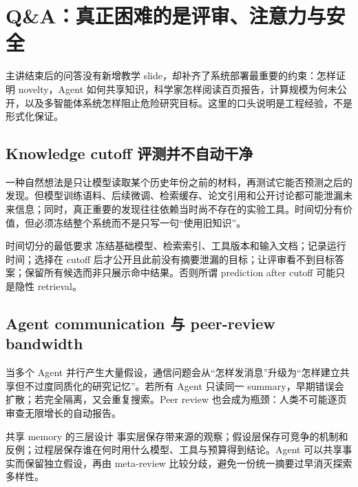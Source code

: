 \section{Q\&A：真正困难的是评审、注意力与安全}

主讲结束后的问答没有新增教学 slide，却补齐了系统部署最重要的约束：怎样证明 novelty，Agent 如何共享知识，科学家怎样阅读百页报告，计算规模为何未公开，以及多智能体系统怎样阻止危险研究目标。这里的口头说明是工程经验，不是形式化保证。

\subsection{Knowledge cutoff 评测并不自动干净}

一种自然想法是只让模型读取某个历史年份之前的材料，再测试它能否预测之后的发现。但模型训练语料、后续微调、检索缓存、论文引用和公开讨论都可能泄漏未来信息；同时，真正重要的发现往往依赖当时尚不存在的实验工具。时间切分有价值，但必须冻结整个系统而不是只写一句“使用旧知识”。

\begin{warningbox}{时间切分的最低要求}
冻结基础模型、检索索引、工具版本和输入文档；记录运行时间；选择在 cutoff 后才公开且此前没有摘要泄漏的目标；让评审看不到目标答案；保留所有候选而非只展示命中结果。否则所谓 prediction after cutoff 可能只是隐性 retrieval。
\end{warningbox}


\subsection{Agent communication 与 peer-review bandwidth}

当多个 Agent 并行产生大量假设，通信问题会从“怎样发消息”升级为“怎样建立共享但不过度同质化的研究记忆”。若所有 Agent 只读同一 summary，早期错误会扩散；若完全隔离，又会重复搜索。Peer review 也会成为瓶颈：人类不可能逐页审查无限增长的自动报告。

\begin{knowledgebox}{共享 memory 的三层设计}
事实层保存带来源的观察；假设层保存可竞争的机制和反例；过程层保存谁在何时用什么模型、工具与预算得到结论。Agent 可以共享事实而保留独立假设，再由 meta-review 比较分歧，避免一份统一摘要过早消灭探索多样性。
\end{knowledgebox}


